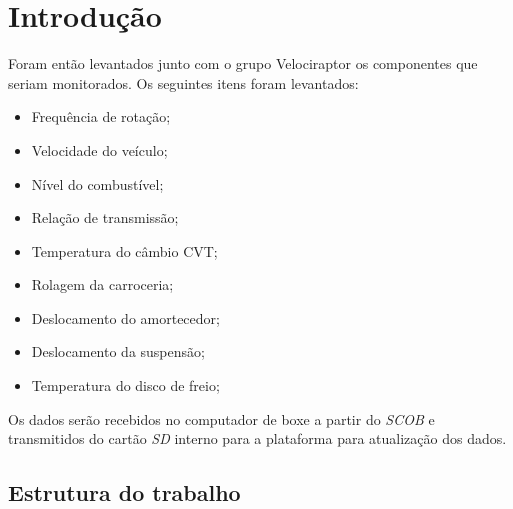 \chapter{Introdução} 
	\label{ch:introducao}
Foram então levantados junto com o grupo Velociraptor os componentes que seriam monitorados. Os seguintes itens foram levantados: 
\begin{itemize}
	\item Frequência de rotação;
	\item Velocidade do veículo;
	\item Nível do combustível;
	\item Relação de transmissão;
	\item Temperatura do câmbio CVT;
	\item Rolagem da carroceria;
	\item Deslocamento do amortecedor;
	\item Deslocamento da suspensão;
	\item Temperatura do disco de freio;
\end{itemize}
\newpage

Os dados serão recebidos no computador de boxe a partir do \textit{SCOB} e transmitidos do cartão \textit{SD} interno para a plataforma para atualização dos dados.  

\section{Estrutura do trabalho}